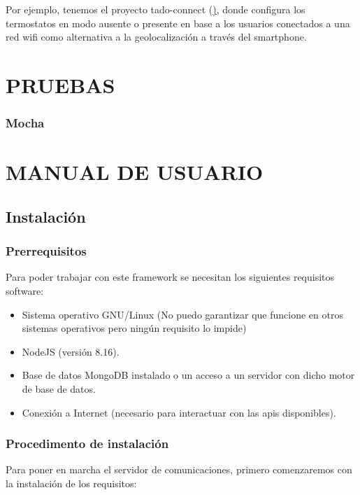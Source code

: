 \documentclass[spanish,12pt, a4paper, twoside]{paper}
\let\oldsection\section
\def\section{\cleardoublepage\oldsection}
\begin{document}
Por ejemplo, tenemos el proyecto tado-connect (\href{https://github.com/Martijn02/tado-connect}), donde configura los termostatos en modo ausente o presente en base a los usuarios conectados a una red wifi como alternativa a la geolocalización a través del smartphone.

\section{PRUEBAS}

\subsubsection{Mocha}

\section{MANUAL DE USUARIO}

\subsection{Instalación}

\subsubsection{Prerrequisitos}

Para poder trabajar con este framework se necesitan los siguientes requisitos software:

\begin{itemize}
\item Sistema operativo GNU/Linux (No puedo garantizar que funcione en otros sistemas operativos pero ningún requisito lo impide)
\item NodeJS (versión 8.16).
\item Base de datos MongoDB instalado o un acceso a un servidor con dicho motor de base de datos.
\item Conexión a Internet (necesario para interactuar con las apis disponibles).
\end{itemize}

\subsubsection{Procedimento de instalación}

Para poner en marcha el servidor de comunicaciones, primero comenzaremos con la instalación de los requisitos:
\end{document}
